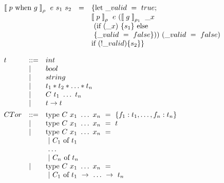 \begin{center}
\small
$
\begin{array}{lll}
\mathrel{{\llbracket}} p ~ \mbox{when} ~ g \mathrel{{\rrbracket}} _{\rho} ~ e ~ s_1 ~ s_2 &=& \{ \mbox{let} ~ \_valid ~ = ~ true; \\ 
& & \mathrel{{\llbracket}} p \mathrel{{\rrbracket}} _{\rho} ~ e ~ (\mathrel{{\llbracket}} g \mathrel{{\rrbracket}} _{\rho_1} ~ \_x ~ \\
& & ~(\mbox{if} ~ (\_x) ~ \{ s_1 \} ~ \mbox{else} ~ \\ & & ~\{ \_valid ~=~ false \})) ~ (\_valid ~=~ false) \\
& & \mbox{if} ~ (!\_valid) \{ s_2 \} \}
\end{array}
$\normalsize
\captionsetup{type=lstlisting}
\label{tbl:tr_wos2}
\end{center}

\clearpage

\begin{center}
$
\begin{array}{lll}
t & \bnfdef & int  \\
  & \bnfalt & bool \\
  & \bnfalt & string \\
  & \bnfalt & t_1 * t_2 * \ldots * t_n \\
  & \bnfalt & C ~ t_1 ~ \ldots ~ t_n \\
  & \bnfalt & t \to t \\[1ex]
  
CTor & \bnfdef & \mbox{type}~C~x_1~\ldots ~x_n~=~ \{f_1:t_1, \ldots, f_n:t_n\} \\ 
  & \bnfalt & \mbox{type}~C~x_1~\ldots ~x_n~=~ t \\
  & \bnfalt & \mbox{type}~C~x_1~\ldots ~x_n~=~ \\
  & & ~|~C_1~\mbox{of}~t_1 \\ 
  & & ~\ldots \\
  & & ~|~C_n~\mbox{of}~t_n \\
  & \bnfalt & \mbox{type}~C~x_1~\ldots ~x_n~=~ \\
  & & ~|~C_1~\mbox{of}~t_1~\to~\ldots~\to~t_n
\end{array}
$
\captionsetup{type=lstlisting}
\label{tbl:syntaxml_types}
\end{center}

